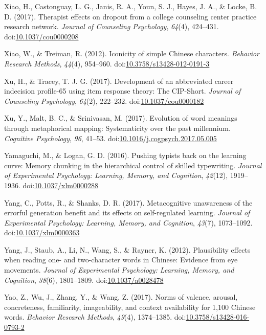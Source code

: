 \documentclass[english,man]{apa6}
\begin{document}
\hypertarget{ref-Xiao2017}{}
Xiao, H., Castonguay, L. G., Janis, R. A., Youn, S. J., Hayes, J. A., \&
Locke, B. D. (2017). Therapist effects on dropout from a college
counseling center practice research network. \emph{Journal of Counseling
Psychology}, \emph{64}(4), 424--431.
doi:\href{https://doi.org/10.1037/cou0000208}{10.1037/cou0000208}

\hypertarget{ref-Xiao2012}{}
Xiao, W., \& Treiman, R. (2012). Iconicity of simple Chinese characters.
\emph{Behavior Research Methods}, \emph{44}(4), 954--960.
doi:\href{https://doi.org/10.3758/s13428-012-0191-3}{10.3758/s13428-012-0191-3}

\hypertarget{ref-Xu2017}{}
Xu, H., \& Tracey, T. J. G. (2017). Development of an abbreviated career
indecision profile-65 using item response theory: The CIP-Short.
\emph{Journal of Counseling Psychology}, \emph{64}(2), 222--232.
doi:\href{https://doi.org/10.1037/cou0000182}{10.1037/cou0000182}

\hypertarget{ref-Xu2017a}{}
Xu, Y., Malt, B. C., \& Srinivasan, M. (2017). Evolution of word
meanings through metaphorical mapping: Systematicity over the past
millennium. \emph{Cognitive Psychology}, \emph{96}, 41--53.
doi:\href{https://doi.org/10.1016/j.cogpsych.2017.05.005}{10.1016/j.cogpsych.2017.05.005}

\hypertarget{ref-Yamaguchi2017}{}
Yamaguchi, M., \& Logan, G. D. (2016). Pushing typists back on the
learning curve: Memory chunking in the hierarchical control of skilled
typewriting. \emph{Journal of Experimental Psychology: Learning, Memory,
and Cognition}, \emph{42}(12), 1919--1936.
doi:\href{https://doi.org/10.1037/xlm0000288}{10.1037/xlm0000288}

\hypertarget{ref-Yang2017}{}
Yang, C., Potts, R., \& Shanks, D. R. (2017). Metacognitive unawareness
of the errorful generation benefit and its effects on self-regulated
learning. \emph{Journal of Experimental Psychology: Learning, Memory,
and Cognition}, \emph{43}(7), 1073--1092.
doi:\href{https://doi.org/10.1037/xlm0000363}{10.1037/xlm0000363}

\hypertarget{ref-Yang2012}{}
Yang, J., Staub, A., Li, N., Wang, S., \& Rayner, K. (2012).
Plausibility effects when reading one- and two-character words in
Chinese: Evidence from eye movements. \emph{Journal of Experimental
Psychology: Learning, Memory, and Cognition}, \emph{38}(6), 1801--1809.
doi:\href{https://doi.org/10.1037/a0028478}{10.1037/a0028478}

\hypertarget{ref-Yao2017}{}
Yao, Z., Wu, J., Zhang, Y., \& Wang, Z. (2017). Norms of valence,
arousal, concreteness, familiarity, imageability, and context
availability for 1,100 Chinese words. \emph{Behavior Research Methods},
\emph{49}(4), 1374--1385.
doi:\href{https://doi.org/10.3758/s13428-016-0793-2}{10.3758/s13428-016-0793-2}
\end{document}
